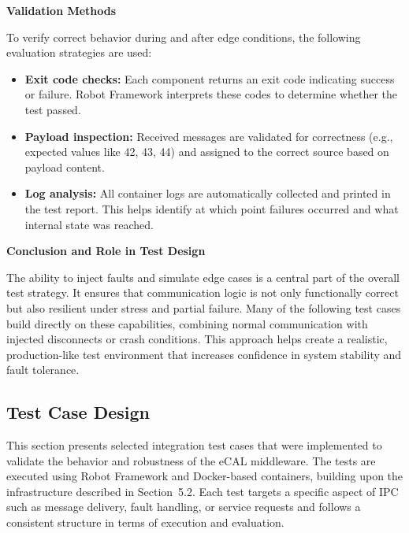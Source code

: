 \vspace{0.5em}
\textbf{Validation Methods}

\vspace{0.4em}
To verify correct behavior during and after edge conditions, the following evaluation strategies are used:

\begin{itemize}
	\item \textbf{Exit code checks:} Each component returns an exit code indicating success or failure. Robot Framework interprets these codes to determine whether the test passed.
	
	\item \textbf{Payload inspection:} Received messages are validated for correctness (e.g., expected values like 42, 43, 44) and assigned to the correct source based on payload content.
	
	\item \textbf{Log analysis:} All container logs are automatically collected and printed in the test report. This helps identify at which point failures occurred and what internal state was reached.
\end{itemize}

\vspace{0.5em}
\textbf{Conclusion and Role in Test Design}

\vspace{0.4em}
The ability to inject faults and simulate edge cases is a central part of the overall test strategy. It ensures that communication logic is not only functionally correct but also resilient under stress and partial failure. Many of the following test cases build directly on these capabilities, combining normal communication with injected disconnects or crash conditions. This approach helps create a realistic, production-like test environment that increases confidence in system stability and fault tolerance.


\subsection{Test Case Design}

This section presents selected integration test cases that were implemented to validate the behavior and robustness of the eCAL middleware. The tests are executed using Robot Framework and Docker-based containers, building upon the infrastructure described in Section~5.2. Each test targets a specific aspect of IPC such as message delivery, fault handling, or service requests and follows a consistent structure in terms of execution and evaluation.

